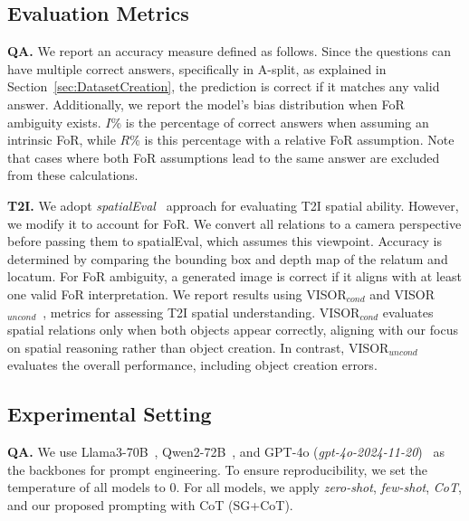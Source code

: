 \subsection{Evaluation Metrics}\label{sec:evaluation_setting}
\noindent\textbf{QA.}  We report an accuracy measure defined as follows. Since the questions can have multiple correct answers, specifically in A-split, as explained in Section~\ref{sec:DatasetCreation}, the prediction is correct if it matches any valid answer.
Additionally, we report the model’s bias distribution when FoR ambiguity exists.
$I$\% is the percentage of correct answers when assuming an intrinsic FoR, while $R$\% is this percentage with a relative FoR assumption. 
Note that cases where both FoR assumptions lead to the same answer are excluded from these calculations.

\noindent\textbf{T2I.} 
We adopt  \textit{spatialEval}~\citep{cho2023visualprogrammingtexttoimagegeneration} approach for evaluating T2I spatial ability. However, we modify it to account for FoR.
We convert all relations to a camera perspective before passing them to spatialEval, which assumes this viewpoint.
Accuracy is determined by comparing the bounding box and depth map of the relatum and locatum. 
For FoR ambiguity, a generated image is correct if it aligns with at least one valid FoR interpretation.
We report results using VISOR$_{cond}$ and VISOR$_{uncond}$~\citep{gokhale2023benchmarkingspatialrelationshipstexttoimage}, metrics for assessing T2I spatial understanding.
VISOR$_{cond}$ evaluates spatial relations only when both objects appear correctly, aligning with our focus on spatial reasoning rather than object creation. In contrast, VISOR$_{uncond}$ evaluates the overall performance, including object creation errors.

\subsection{Experimental Setting}
\noindent\textbf{QA.} We use Llama3-70B~\citep{dubey2024Llama3herdmodels}, Qwen2-72B~\citep{qwen2model}, and GPT-4o (\textit{gpt-4o-2024-11-20})~\citep{openai2024gpt4technicalreport} as the backbones for prompt engineering. 
To ensure reproducibility, we set the temperature of all models to 0.
For all models, we apply \textit{zero-shot}, \textit{few-shot}, \textit{CoT}, and our proposed prompting with CoT (SG+CoT).

